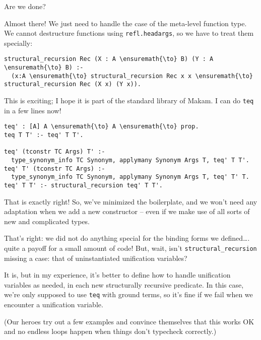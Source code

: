 \heroSTUDENT{} Are we done?

\heroADVISOR{} Almost there! We just need to handle the case of the meta-level
function type. We cannot destructure functions using
\texttt{refl.headargs}, so we have to treat them specially:

\begin{verbatim}
structural_recursion Rec (X : A \ensuremath{\to} B) (Y : A \ensuremath{\to} B) :-
  (x:A \ensuremath{\to} structural_recursion Rec x x \ensuremath{\to} structural_recursion Rec (X x) (Y x)).
\end{verbatim}

\heroSTUDENT{} This is exciting; I hope it is part of the standard library of
Makam. I can do \texttt{teq} in a few lines now!

\begin{verbatim}
teq' : [A] A \ensuremath{\to} A \ensuremath{\to} prop.
teq T T' :- teq' T T'.

teq' (tconstr TC Args) T' :-
  type_synonym_info TC Synonym, applymany Synonym Args T, teq' T T'.
teq' T' (tconstr TC Args) :-
  type_synonym_info TC Synonym, applymany Synonym Args T, teq' T' T.
teq' T T' :- structural_recursion teq' T T'.
\end{verbatim}

\heroADVISOR{} That is exactly right! So, we've minimized the boilerplate, and
we won't need any adaptation when we add a new constructor -- even if we
make use of all sorts of new and complicated types.

\heroSTUDENT{} That's right: we did not do anything special for the binding
forms we defined\ldots{}. quite a payoff for a small amount of code!
But, wait, isn't \texttt{structural\_recursion} missing a case: that of
uninstantiated unification variables?

\heroADVISOR{} It is, but in my experience, it's better to define how to
handle unification variables as needed, in each new structurally
recursive predicate. In this case, we're only supposed to use
\texttt{teq} with ground terms, so it's fine if we fail when we
encounter a unification variable.

\begin{scenecomment}
(Our heroes try out a few examples and convince themselves that this works OK and no endless loops happen when things don't typecheck correctly.)
\end{scenecomment}
